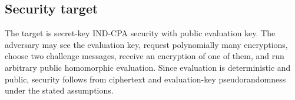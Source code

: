 \subsection{Security target}

The target is secret-key IND-CPA security with public evaluation key.  The adversary may see the evaluation key, request polynomially many encryptions, choose two challenge messages, receive an encryption of one of them, and run arbitrary public homomorphic evaluation.  Since evaluation is deterministic and public, security follows from ciphertext and evaluation-key pseudorandomness under the stated assumptions.
